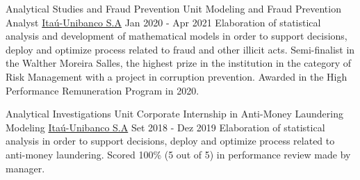 \begin{cventries}
\cventry
{Analytical Studies and Fraud Prevention Unit} %
{Modeling and Fraud Prevention Analyst} %
{\href{https://www.itau.com/}{Itaú-Unibanco S.A}} %
{Jan 2020 - Apr 2021} %
{ %
Elaboration of statistical analysis and development of mathematical models in order to support decisions, deploy and optimize process related to fraud and other illicit acts.\newline
Semi-finalist in the Walther Moreira Salles, the highest prize in the institution in the category of Risk Management with a project in corruption prevention.\newline
Awarded in the High Performance Remuneration Program in 2020.
\newline
}

\cventry
{Analytical Investigations Unit} %
{Corporate Internship in Anti-Money Laundering Modeling} %
{\href{https://www.itau.com/}{Itaú-Unibanco S.A}} %
{Set 2018 - Dez 2019} %
{ %
Elaboration of statistical analysis in order to support decisions, deploy and optimize process related to anti-money laundering.\newline
Scored 100\% (5 out of 5) in performance review made by manager.
\newline
}


\end{cventries}
